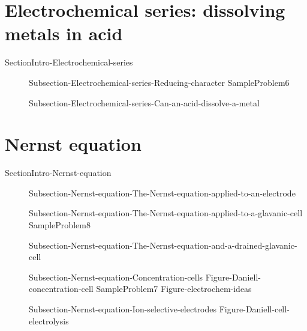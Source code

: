 \documentclass[main.tex]{subfiles}
\newcommand\chapterlabel{Ch-electrochem}\setcounter{figurenewcounter}{0}\setcounter{tablenewcounter}{0}\setcounter{formulanewcounter}{0}\chapterpicture{../{\chapterlabel}/figure1}\chapterpicturelabel{PxFuel}
\begin{document}
\section{Electrochemical series: dissolving metals in acid}{SectionIntro-Electrochemical-series}
\sloppy\begin{description}
   \item[] {Subsection-Electrochemical-series-Reducing-character}
  {SampleProblem6}
\item[] {Subsection-Electrochemical-series-Can-an-acid-dissolve-a-metal}
\end{description}


\section{Nernst equation}{SectionIntro-Nernst-equation}
\sloppy\begin{description}
   \item[] {Subsection-Nernst-equation-The-Nernst-equation-applied-to-an-electrode}
   \item[] {Subsection-Nernst-equation-The-Nernst-equation-applied-to-a-glavanic-cell}
     {SampleProblem8}
   \item[] {Subsection-Nernst-equation-The-Nernst-equation-and-a-drained-glavanic-cell}
   \item[] {Subsection-Nernst-equation-Concentration-cells}
{Figure-Daniell-concentration-cell}
  {SampleProblem7}
 {Figure-electrochem-ideas}
   \item[] {Subsection-Nernst-equation-Ion-selective-electrodes}
\newpage\hspace{-5cm} 
 {Figure-Daniell-cell-electrolysis}
\end{description}
\end{document}
